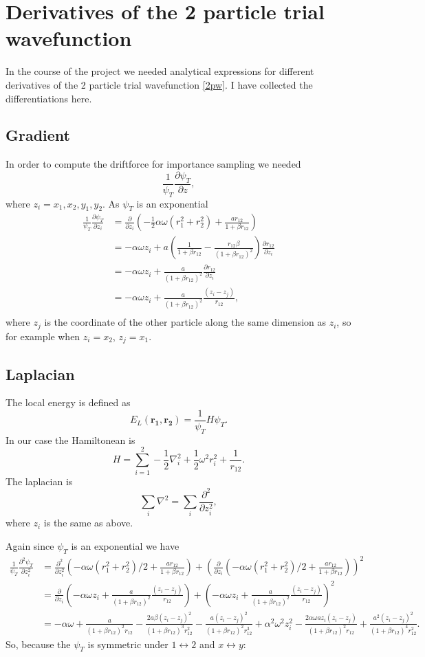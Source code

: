\documentclass[a4paper,English,10pt]{article}
\newcommand{\bb}[1]{\boldsymbol{#1}}
\newcommand{\p}{\partial}
\newcommand{\pddt}[2]{\frac{\p #1}{\p #2}}
\newcommand{\pndt}[3]{\frac{\p^{#3} #1}{\p #2^{#3}}}
\newcommand{\f}{\frac}
\begin{document}
\section{Derivatives of the 2 particle trial wavefunction}
In the course of the project we needed analytical expressions for different derivatives of the 2 particle trial wavefunction \ref{2pw}. I have collected
the differentiations here.

\subsection{Gradient}\label{app2pg}
In order to compute the driftforce for importance sampling we needed
\[\f{1}{\psi_T}\pddt{\psi_T}{z},\]
where \(z_i = x_1,x_2,y_1,y_2\).
As \(\psi_T\) is an exponential
\begin{align*}
  \f{1}{\psi_T}\pddt{\psi_T}{z_i} &= \pddt{}{z_i}\left(-\f{1}{2}\alpha\omega(r_1^2+r_2^2) + \f{ar_{12}}{1+\beta r_{12}}\right)\\
  &= -\alpha\omega z_i + a\left(\f{1}{1+\beta r_{12}} - \f{r_{12}\beta}{(1+\beta r_{12})^2}\right)\pddt{r_{12}}{z_i}\\
  &= -\alpha\omega z_i + \f{a}{(1+\beta r_{12})^2}\pddt{r_{12}}{z_i}\\
  &= -\alpha\omega z_i + \f{a}{(1+\beta r_{12})^2}\f{(z_i-z_j)}{r_{12}},\\
\end{align*}
where \(z_j\) is the coordinate of the other particle along the same dimension as \(z_i\), so for example when
\(z_i=x_2\), \(z_j = x_1\).

\subsection{Laplacian}\label{applap}

The local energy is defined as
\[E_L(\bb{r_1},\bb{r_2}) = \f{1}{\psi_T}H\psi_T.\]
In our case the Hamiltonean is
\[H = \sum_{i=1}^2-\f{1}{2}\nabla_i^2+\f{1}{2}\omega^2r_i^2 + \f{1}{r_{12}}.\]
The laplacian is
\[\sum_i\nabla^2 = \sum_i\pndt{}{z_i}{2},\]
where \(z_i\) is the same as above.

Again since \(\psi_T\) is an exponential we have
\begin{align*}
  \f{1}{\psi_T}\pndt{\psi_T}{z_i}{2} &= \pndt{}{z_i}{2}\left(-\alpha\omega(r_1^2+r_2^2)/2 + \f{ar_{12}}{1+\beta r_{12}}\right) +
    \left(\pddt{}{z_i}\left(-\alpha\omega(r_1^2+r_2^2)/2 + \f{ar_{12}}{1+\beta r_{12}}\right)\right)^2\\
    &= \pddt{}{z_i}\left(-\alpha\omega z_i + \f{a}{(1+\beta r_{12})^2}\f{(z_i-z_j)}{r_{12}}\right) +
    \left(-\alpha\omega z_i + \f{a}{(1+\beta r_{12})^2}\f{(z_i-z_j)}{r_{12}}\right)^2\\
    &= -\alpha\omega + \f{a}{(1+\beta r_{12})^2r_{12}} - \f{2a\beta(z_i-z_j)^2}{(1+\beta r_{12})^3r_{12}^2}
    - \f{a(z_i-z_j)^2}{(1+\beta r_{12})^2r_{12}^3} + \alpha^2\omega^2z_i^2 -
    \f{2\alpha\omega a z_i(z_i-z_j)}{(1+\beta r_{12})^2r_{12}} + \f{a^2(z_i-z_j)^2}{(1+\beta r_{12})^4r_{12}^2}.
\end{align*}
So, because the $\psi_T$ is symmetric under $1\leftrightarrow 2$ and $x\leftrightarrow y$:
\end{document}
